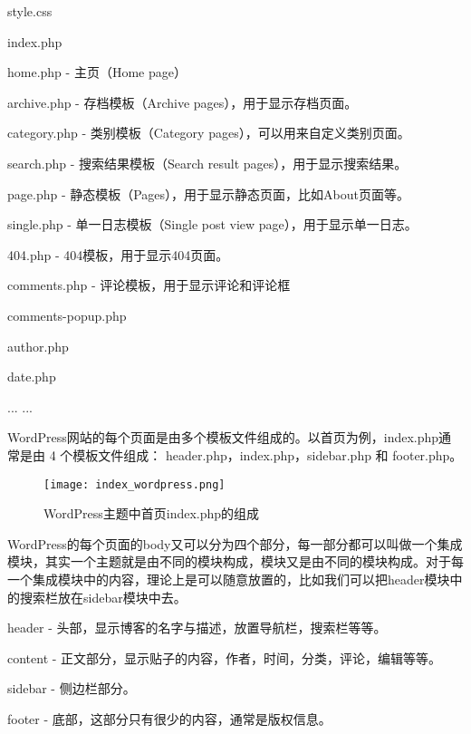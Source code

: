 \begin{compactitem}
\item style.css
\item index.php
\item home.php - 主页（Home page）
\item archive.php - 存档模板（Archive pages），用于显示存档页面。
\item category.php - 类别模板（Category pages），可以用来自定义类别页面。
\item search.php - 搜索结果模板（Search result pages），用于显示搜索结果。
\item page.php - 静态模板（Pages），用于显示静态页面，比如About页面等。
\item single.php - 单一日志模板（Single post view page），用于显示单一日志。
\item 404.php -  404模板，用于显示404页面。
\item comments.php - 评论模板，用于显示评论和评论框
\item comments-popup.php
\item author.php
\item date.php
\item ... ...
\end{compactitem}



WordPress网站的每个页面是由多个模板文件组成的。以首页为例，index.php通常是由 4 个模板文件组成： header.php，index.php，sidebar.php 和 footer.php。

\begin{figure}[!ht]
\centering
\texttt{[image: index\_wordpress.png]}
\caption{WordPress主题中首页index.php的组成}
\end{figure}


WordPress的每个页面的body又可以分为四个部分，每一部分都可以叫做一个集成模块，其实一个主题就是由不同的模块构成，模块又是由不同的模块构成。对于每一个集成模块中的内容，理论上是可以随意放置的，比如我们可以把header模块中的搜索栏放在sidebar模块中去。

\begin{compactitem}
\item header - 头部，显示博客的名字与描述，放置导航栏，搜索栏等等。
\item content - 正文部分，显示贴子的内容，作者，时间，分类，评论，编辑等等。
\item sidebar - 侧边栏部分。
\item footer - 底部，这部分只有很少的内容，通常是版权信息。
\end{compactitem}



